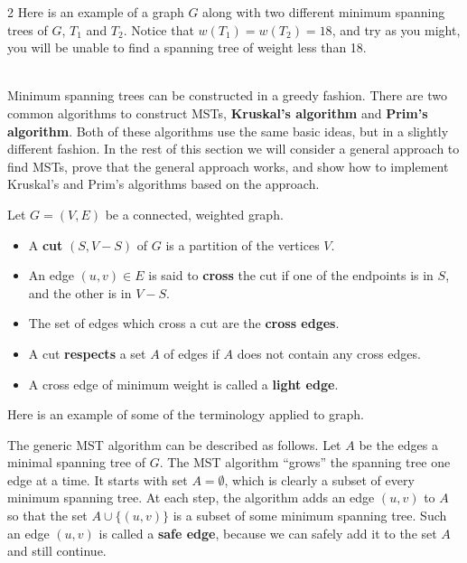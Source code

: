 \begin{exa}
\begin{multicols}{2}
Here is an example of a graph $G$ along with 
two different minimum spanning trees of $G$,
$T_1$ and $T_2$.
Notice that $w(T_1)=w(T_2)=18$, and try as you might,
you will be unable to find a spanning tree of weight less than 18.
\\

\ \ \ 
\end{multicols}
\end{exa}


Minimum spanning trees can be constructed in a greedy fashion.
There are two common algorithms to construct MSTs, 
{\bf Kruskal's algorithm} and {\bf Prim's algorithm}.
Both of these algorithms use the same basic ideas, but
in a slightly different fashion.
In the rest of this section
we will consider a general approach to find MSTs,
prove that the general approach works,
and show how to implement 
Kruskal's  and Prim's algorithms based on the approach.

\begin{df}
Let $G=(V,E)$ be a connected, weighted graph.
\begin{itemize}
\item
A {\bf cut} $(S,V-S)$ of $G$ is a partition of the vertices $V$.
\item
An edge $(u,v)\in E$ is said to {\bf cross} the cut if 
one of the endpoints is in $S$, and the other is in $V-S$.
\item
The set of edges which cross a cut are the {\bf cross edges}.
\item
A cut {\bf respects} a set $A$ of edges if $A$
does not contain any cross edges.
\item
A cross edge of minimum weight is 
called a {\bf light edge}.
\end{itemize}
\end{df}

\begin{exa}\label{exa:cuts}
Here is an example of some of the terminology applied to graph.\\

\end{exa}


The generic MST algorithm can be described as follows.
Let $A$ be the edges a minimal spanning tree of $G$.
The MST algorithm ``grows'' the spanning tree 
one edge at a time.
It starts with set $A=\emptyset$, which is clearly a subset of
every minimum spanning tree.
At each step, the algorithm adds an edge 
$(u,v)$ to $A$ so that the set $A\cup\{(u,v)\}$ is a
subset of some minimum spanning tree.
Such an edge $(u,v)$ is called a {\bf safe edge},
 because
we can safely add it to the set $A$ and still continue.

